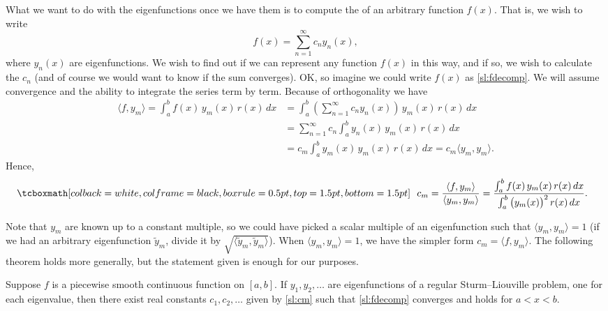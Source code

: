 What we want to do with the eigenfunctions once we have them is to
compute the \emph{} of an arbitrary
function $f(x)$.  That is, we wish to write
\begin{equation} \label{sl:fdecomp}
f(x) = \sum_{n=1}^\infty c_n y_n(x) ,
\end{equation}
where $y_n(x)$ are eigenfunctions.
We wish to find out if we can represent
any function $f(x)$ in this way,
and if so, we wish to calculate the $c_n$ (and of course we would want to know if
the sum converges).  OK\@, so imagine
we could write $f(x)$ as \eqref{sl:fdecomp}.  We will assume convergence and
the ability to integrate the series term by term.
Because of orthogonality we have
\begin{equation*}
\begin{split}
\langle f , y_m \rangle
 = \int_a^b f(x) \, y_m (x) \, r(x) \, dx
& = \int_a^b \left( \sum_{n=1}^\infty c_n y_n(x) \right) \, y_m (x) \, r(x)
\, dx\\
&= \sum_{n=1}^\infty c_n \int_a^b y_n(x) \, y_m (x) \, r(x) \, dx\\
&= c_m \int_a^b y_m(x) \, y_m (x) \, r(x) \, dx = c_m \langle y_m , y_m \rangle
.
\end{split}
\end{equation*}
Hence,
\begin{equation} \label{sl:cm}
\mybxbg{~~
c_m = \frac{\langle f , y_m \rangle}{\langle y_m , y_m \rangle}
=
\frac{\int_a^b f(x) \, y_m (x)\, r(x) \, dx}%
{\int_a^b {\bigl(y_m(x)\bigr)}^2 \, r(x) \,dx} .
~~}
\end{equation}

Note that $y_m$ are known up to a constant multiple, so we could have picked
a scalar multiple of an eigenfunction such that
$\langle y_m , y_m \rangle = 1$ (if we had an arbitrary eigenfunction
$\tilde{y}_m$, divide it
by $\sqrt{\langle \tilde{y}_m , \tilde{y}_m \rangle}$).
When
$\langle y_m , y_m \rangle = 1$,
we have the
simpler form $c_m = \langle f, y_m \rangle$.
The following theorem holds
more generally, but the statement given is enough for our purposes.

\begin{theorem}
Suppose $f$ is a piecewise smooth continuous function on $[a,b]$.  If $y_1,
y_2, \ldots$ are eigenfunctions of a regular Sturm--Liouville problem,
one for each eigenvalue,
then there exist real constants $c_1, c_2, \ldots$ given by \eqref{sl:cm}
such that
\eqref{sl:fdecomp} converges and holds for $a < x < b$.
\end{theorem}

